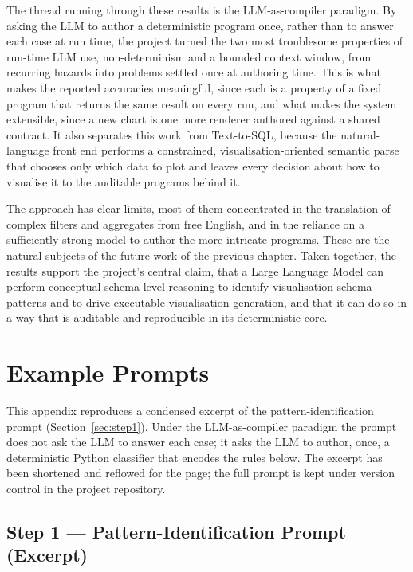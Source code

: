 The thread running through these results is the LLM-as-compiler paradigm. By asking the LLM to author a deterministic program once, rather than to answer each case at run time, the project turned the two most troublesome properties of run-time LLM use, non-determinism and a bounded context window, from recurring hazards into problems settled once at authoring time. This is what makes the reported accuracies meaningful, since each is a property of a fixed program that returns the same result on every run, and what makes the system extensible, since a new chart is one more renderer authored against a shared contract. It also separates this work from Text-to-SQL, because the natural-language front end performs a constrained, visualisation-oriented semantic parse that chooses only which data to plot and leaves every decision about how to visualise it to the auditable programs behind it.

The approach has clear limits, most of them concentrated in the translation of complex filters and aggregates from free English, and in the reliance on a sufficiently strong model to author the more intricate programs. These are the natural subjects of the future work of the previous chapter. Taken together, the results support the project's central claim, that a Large Language Model can perform conceptual-schema-level reasoning to identify visualisation schema patterns and to drive executable visualisation generation, and that it can do so in a way that is auditable and reproducible in its deterministic core.


\appendix

\chapter{Example Prompts}
\label{app:prompts}

This appendix reproduces a condensed excerpt of the pattern-identification
prompt (Section~\ref{sec:step1}). Under the LLM-as-compiler paradigm the prompt does
not ask the LLM to answer each case; it asks the LLM to author, once, a
deterministic Python classifier that encodes the rules below. The excerpt has been
shortened and reflowed for the page; the full prompt is kept under version control in
the project repository.

\section{Step 1 --- Pattern-Identification Prompt (Excerpt)}
\label{app:step1-prompt}

